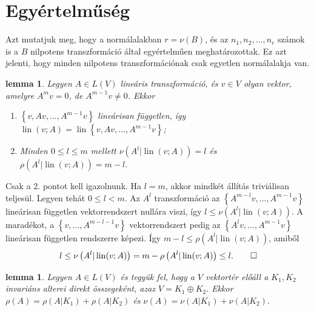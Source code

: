 \documentclass[a4paper, showtrims]{memoir}
\makeatletter
\renewenvironment{proof}[1][\proofname]
    {\par\pushQED{\qed}%
    \normalfont \topsep6\p@\@plus6\p@\relax
    \trivlist
    \item[\hskip\labelsep
        \itshape
    #1\@addpunct{:}]\ignorespaces}
    {\popQED\endtrivlist\@endpefalse}
\theoremstyle{plain}
\newtheorem{lemma}[proposition]{lemma}
\theoremstyle{remark}
\theoremstyle{definition}
\DeclareMathOperator{\lin}{lin}
\makeatother
\begin{document}
\section{Egyértelműség}
Azt mutatjuk meg, hogy a normálalakban $r=\nu\left( B \right)$,
és az $n_1,n_2,\ldots,n_r$ számok is a $B$ nilpotens transzformáció által egyértelműen meghatározottak.
Ez azt jelenti, hogy minden nilpotens transzformációnak csak egyetlen normálalakja van.
\begin{lemma}
	Legyen $A\in L\left( V \right)$ lineáris transzformáció, és $v\in V$ olyan vektor, amelyre
	$A^mv=0$, de $A^{m-1}v\neq 0$.
	Ekkor
	\begin{enumerate}
		\item
		      $\left\{ v,Av,\ldots,A^{m-1}v \right\}$ lineárisan független,
		      így $\lin(v;A )=\lin\left\{ v,Av,\ldots,A^{m-1}v \right\}$;
		\item
		      Minden $0\leq l\leq m$ mellett
		      \begin{math}
			      \nu\left( A^l|\lin(v;A) \right)=l
		      \end{math}
		      és
		      \begin{math}
			      \rho\left( A^l|\lin(v;A) \right)=m-l.
		      \end{math}\qedhere
	\end{enumerate}
\end{lemma}
\begin{proof}
	Csak a 2. pontot kell igazolnunk.
    Ha $l=m$, akkor mindkét állítás triviálisan teljesül. Legyen tehát $0\leq l<m$.
	Az $A^l$ transzformáció az $\left\{ A^{m-l}v,\ldots,A^{m-1}v \right\}$
	lineárisan független vektorrendszert nullára viszi,
	így $l\leq\nu\left( A^l|\lin(v;A)\right)$.
	A maradékot, a
	$\left\{ v,\ldots,A^{m-l-1}v \right\}$ vektorrendszert pedig az
	$\left\{ A^lv,\ldots,A^{m-1}v \right\}$ lineárisan független rendszerre képezi.
	Így
	$m-l\leq \rho\left( A^l |\lin(v;A)\right)$,
	amiből
	\[
		l\leq\nu\left( A^l|\lin(v;A) \right)=m-\rho\left( A^l|\lin(v;A) \right)\leq l.\qedhere
	\]
\end{proof}
\begin{lemma}
	Legyen $A\in L\left( V \right)$ és tegyük fel, hogy a $V$ vektortér előáll a $K_1,K_2$ invariáns alterei
	direkt összegeként, azaz
	\(
	V=K_1\oplus K_2.
	\)
	Ekkor
	\begin{math}
		\rho\left( A \right)=\rho\left( A|K_1 \right)+\rho\left( A|K_2 \right)
	\end{math}
	és
	\begin{math}
		\nu\left( A \right)=\nu\left( A|K_1 \right)+\nu\left( A|K_2 \right).
	\end{math}
	\qedhere
\end{lemma}
\end{document}
